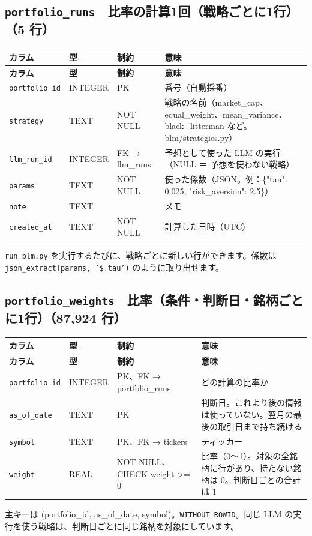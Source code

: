 \documentclass[xelatex,ja=standard,jafont=hiragino-pron,a4paper,10pt]{bxjsreport}
\begin{document}
\subsection*{\texttt{portfolio\_\allowbreak{}runs}　比率の計算1回（戦略ごとに1行）（5 行）}
{\footnotesize
\begin{longtable}{p{3.30cm}p{1.40cm}p{3.00cm}p{6.40cm}}
\toprule
\textbf{カラム} & \textbf{型} & \textbf{制約} & \textbf{意味} \\
\midrule
\endfirsthead
\toprule
\textbf{カラム} & \textbf{型} & \textbf{制約} & \textbf{意味} \\
\midrule
\endhead
\bottomrule
\endfoot
\texttt{portfolio\_\allowbreak{}id} & INTEGER & PK & 番号（自動採番） \\
\texttt{strategy} & TEXT & NOT NULL & 戦略の名前（market\_cap、equal\_weight、mean\_variance、black\_litterman など。blm/strategies.py） \\
\texttt{llm\_\allowbreak{}run\_\allowbreak{}id} & INTEGER & FK → llm\_runs & 予想として使った LLM の実行（NULL ＝ 予想を使わない戦略） \\
\texttt{params} & TEXT & NOT NULL & 使った係数（JSON。例：\{"tau": 0.025, "risk\_aversion": 2.5\}） \\
\texttt{note} & TEXT &  & メモ \\
\texttt{created\_\allowbreak{}at} & TEXT & NOT NULL & 計算した日時（UTC） \\
\end{longtable}
}
{\small \texttt{run\_\allowbreak{}blm.py} を実行するたびに、戦略ごとに新しい行ができます。係数は \texttt{json\_\allowbreak{}extract(params, '\$.\allowbreak{}tau')} のように取り出せます。\par}
\medskip
\subsection*{\texttt{portfolio\_\allowbreak{}weights}　比率（条件・判断日・銘柄ごとに1行）（87,924 行）}
{\footnotesize
\begin{longtable}{p{3.30cm}p{1.40cm}p{3.00cm}p{6.40cm}}
\toprule
\textbf{カラム} & \textbf{型} & \textbf{制約} & \textbf{意味} \\
\midrule
\endfirsthead
\toprule
\textbf{カラム} & \textbf{型} & \textbf{制約} & \textbf{意味} \\
\midrule
\endhead
\bottomrule
\endfoot
\texttt{portfolio\_\allowbreak{}id} & INTEGER & PK、FK → portfolio\_runs & どの計算の比率か \\
\texttt{as\_\allowbreak{}of\_\allowbreak{}date} & TEXT & PK & 判断日。これより後の情報は使っていない。翌月の最後の取引日まで持ち続ける \\
\texttt{symbol} & TEXT & PK、FK → tickers & ティッカー \\
\texttt{weight} & REAL & NOT NULL、CHECK weight \textgreater{}= 0 & 比率（0〜1）。対象の全銘柄に行があり、持たない銘柄は 0。判断日ごとの合計は 1 \\
\end{longtable}
}
{\small 主キーは (portfolio\_id, as\_of\_date, symbol)。\texttt{WITHOUT ROWID}。同じ LLM の実行を使う戦略は、判断日ごとに同じ銘柄を対象にしています。\par}
\medskip
\end{document}
